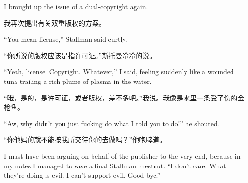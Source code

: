 
\ifdefined\eng
I brought up the issue of a dual-copyright again.
\fi

\ifdefined\chs
我再次提出有关双重版权的方案。
\fi

\ifdefined\eng
``You mean license,'' Stallman said curtly.
\fi

\ifdefined\chs
“你所说的版权应该是指许可证。”斯托曼冷冷的说。
\fi

\ifdefined\eng
``Yeah, license. Copyright. Whatever,'' I said, feeling suddenly like a wounded tuna trailing a rich plume of plasma in the water.
\fi

\ifdefined\chs
“哦，是的，是许可证，或者版权，差不多吧。”我说。我像是水里一条受了伤的金枪鱼。
\fi

\ifdefined\eng
``Aw, why didn't you just fucking do what I told you to do!'' he shouted.  %
\fi

\ifdefined\chs
“你他妈的就不能按我所交待你的去做吗？”他咆哮道。%
\fi

\ifdefined\eng
I must have been arguing on behalf of the publisher to the very end, because in my notes I managed to save a final Stallman chestnut: ``I don't care. What they're doing is evil. I can't support evil. Good-bye.''  %
\fi

